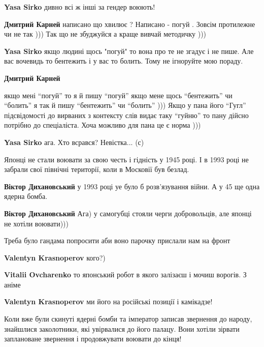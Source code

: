 \begin{itemize}
\begin{itemize}
\textbf{Yasa Sirko} дивно всі ж інші за гендер воюють!

\textbf{Дмитрий Карней} написано що хвилює ? Написано - погуй . Зовсім протилежне
чи не так ))) Так що не збуджуйся а краще вивчай методичку )))

\textbf{Yasa Sirko} якщо людині щось "погуй" то вона про те не згадує і не пише. Але вас вочевидь то бентежить і у вас то болить. Тому не ігноруйте мою пораду.

\textbf{Дмитрий Карней} 

якщо мені \enquote{погуй} то я й пишу \enquote{погуй} якщо мене щось \enquote{бентежить} чи
\enquote{болить} я так й пишу \enquote{бентежить} чи \enquote{болить} ))) Якщо у пана його \enquote{Гугл}
підсвідомості до вирваних з контексту слів видає таку \enquote{гуйню} то пану дійсно
потрібно до спеціаліста. Хоча можливо для пана це є норма )))

\textbf{Yasa Sirko} ага. Хто всрався? Невістка... (с)
\end{itemize} %


Японці не стали воювати за свою честь і гідність у 1945 році. І в 1993 році не
забрали свої північні території, коли в Московії був безлад.

\begin{itemize} %
\textbf{Віктор Дихановський} у 1993 році уе було б розв’язування війни. А у 45 ще одна ядерна бомба.

\textbf{Віктор Дихановський} Ага) у самогубці стояли черги добровольців, але японці не хотіли воювати)))
\end{itemize} %

Треба було гандама попросити аби воно парочку прислали нам на фронт

\begin{itemize} %
\textbf{Valentyn Krasnoperov} кого?)

\textbf{Vitalii Ovcharenko} то японський робот в якого залізаєш і мочиш ворогів. З аніме

\textbf{Valentyn Krasnoperov} ми його на російські позиції і камікадзе!
\end{itemize} %


Коли вже були скинуті ядерні бомби та імператор записав звернення до народу,
знайшлися заколотники, які увірвалися до його палацу. Вони хотіли зірвати
заплановане звернення і продовжувати воювати до кінця!




\end{itemize} %
